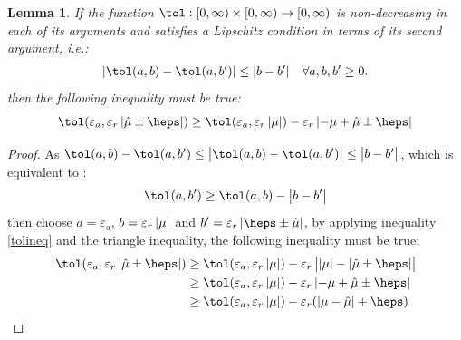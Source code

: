 \documentclass{iitthesis}
\newtheorem{lemma}[theorem]{Lemma}
\begin{document}
\begin{lemma}\label{cost1}
If the function $\tol: [0, \infty) \times [0, \infty) \to [0,\infty)$ is non-decreasing in each of its arguments and satisfies a Lipschitz condition in terms of its second argument, i.e.:
\begin{align}
|\tol (a,b)-\tol (a,b')| \leq |b-b'| \quad \forall a,b,b' \geq 0.
\end{align}
then the following inequality must be true:
$$\tol (\varepsilon_a, \varepsilon_r \abs{\hmu \pm\heps }) \geq \tol(\varepsilon_a,\varepsilon_r \abs{\mu})-\varepsilon_r \abs{-\mu+\hmu \pm\heps}$$
\end{lemma}
\begin{proof}
As $\tol(a,b) -\tol(a,b') \leq \abs{\tol(a,b) -\tol(a,b')} \leq \abs{b-b'}$, 
which is equivalent to :
\begin{align}\label{tolineq}
\tol(a,b') \geq \tol(a,b)-\abs{b-b'}
\end{align}
then choose $a = \varepsilon_a$, $b =\varepsilon_r\left \lvert \mu \right \rvert$ and $b'=\varepsilon_r\abs{\heps \pm \hmu}$, by applying inequality \eqref{tolineq} and the triangle inequality, the following inequality must be true:
\begin{align}
\tol (\varepsilon_a, \varepsilon_r \abs{\hmu \pm\heps}) &
 \geq \tol(\varepsilon_a,\varepsilon_r \abs{\mu})-\varepsilon_r \abs{\abs{\mu}-\abs{\hmu  \pm \heps}} \\&\geq \tol(\varepsilon_a,\varepsilon_r \abs{\mu})-\varepsilon_r \abs{-\mu+\hmu \pm \heps} \\&
 \geq \tol(\varepsilon_a,\varepsilon_r \abs{\mu})-\varepsilon_r (\abs{\mu-\hmu} + \heps)
  \label{lipstol}
\end{align}
\end{proof}
\end{document}
